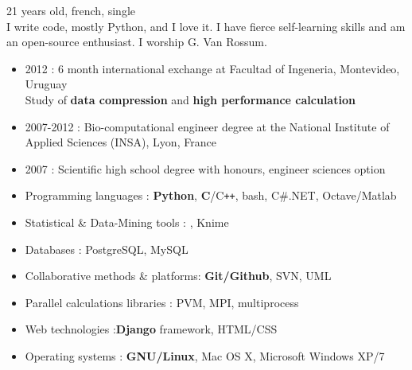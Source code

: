 \bigskip


{\scriptsize 21 years old, french, single\\I write code, mostly Python, and I love it. I have fierce self-learning skills and am an open-source enthusiast. I worship G. Van Rossum.}\\

\vspace{-7mm}

\begin{itemize}
\renewcommand{\labelitemi}{$\circ$}
		\item 2012 : 6 month international exchange at Facultad of Ingeneria, Montevideo, Uruguay\\ Study of \textbf{data compression} and \textbf{high performance calculation}
        \item 2007-2012 : Bio-computational engineer degree at the National Institute of Applied Sciences (INSA), Lyon, France
        \item 2007 : Scientific high school degree with honours, engineer sciences option
\end{itemize}


\begin{itemize}
\renewcommand{\labelitemi}{$\circ$}
    \item Programming languages : \textbf{Python}, \textbf{C}/C{\tt ++}, bash, C\#.NET, Octave/Matlab
    \item Statistical \& Data-Mining tools : \Rlogo, Knime
    \item Databases : PostgreSQL, MySQL
    \item Collaborative methods \& platforms: \textbf{Git/Github}, SVN, UML
    \item Parallel calculations libraries : PVM, MPI, multiprocess
    \item Web technologies :\textbf{Django} framework, HTML/CSS
    \item Operating systems : \textbf{GNU/Linux}, Mac OS X, Microsoft Windows XP/7
\end{itemize}


